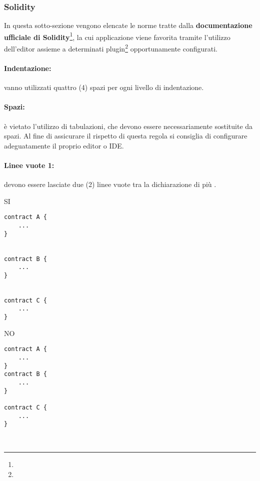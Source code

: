 \documentclass[../ProcessiPrimari.tex]{subfiles}
\begin{document}
	
\subsubsection{Solidity}
In questa sotto-sezione vengono elencate le norme tratte dalla \textbf{documentazione ufficiale di Solidity}\footnote{}, la cui applicazione viene favorita tramite l'utilizzo dell'editor  assieme a determinati plugin\footnote{} opportunamente configurati.
\paragraph*{Indentazione: }
vanno utilizzati quattro (4) spazi per ogni livello di indentazione.
\paragraph*{Spazi: }
è vietato l'utilizzo di tabulazioni, che devono essere necessariamente sostituite da spazi. Al fine di assicurare il rispetto di questa regola si consiglia di configurare adeguatamente il proprio editor o IDE.
\paragraph*{Linee vuote 1: }
devono essere lasciate due (2) linee vuote tra la dichiarazione di più .
\begin{center}{
\begin{minipage}{6cm}
{\begin{center}SI\end{center}}
\begin{Verbatim}[frame=single]
contract A {
    ...
}


contract B {
    ...
}


contract C {
    ...
}
\end{Verbatim}
\end{minipage}
\hfil
\begin{minipage}{6cm}
{\begin{center}NO\end{center}}
\begin{Verbatim}[frame=single]
contract A {
    ...
}
contract B {
    ...
}

contract C {
    ...
}



\end{Verbatim}
\end{minipage}
}
\end{center}
\end{document}
